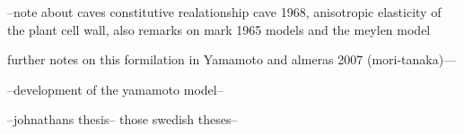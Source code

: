 --note about caves constitutive realationship cave 1968, anisotropic elasticity of the plant cell wall,\cite{Cave_1968} also remarks on mark 1965 models and the meylen model

further notes on this formilation in Yamamoto and almeras 2007 (mori-tanaka)\cite{Yamamoto_2007}---

--development of the yamamoto model--

--johnathans thesis-- those swedish theses--
